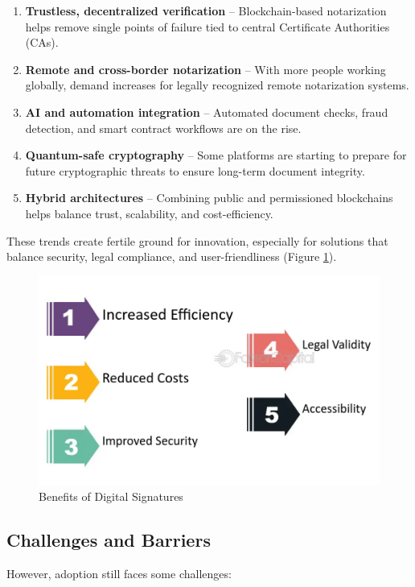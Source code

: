 \begin{enumerate}
    \item \textbf{Trustless, decentralized verification} – Blockchain-based notarization helps remove single points of failure tied to central Certificate Authorities (CAs).
    \item \textbf{Remote and cross-border notarization} – With more people working globally, demand increases for legally recognized remote notarization systems.
    \item \textbf{AI and automation integration} – Automated document checks, fraud detection, and smart contract workflows are on the rise.
    \item \textbf{Quantum-safe cryptography} – Some platforms are starting to prepare for future cryptographic threats to ensure long-term document integrity.
    \item \textbf{Hybrid architectures} – Combining public and permissioned blockchains helps balance trust, scalability, and cost-efficiency.
\end{enumerate}

These trends create fertile ground for innovation, especially for solutions that balance security, legal compliance, and user-friendliness (Figure \ref{benefits-signatures}).

\begin{figure}[H]
    \centering
    \includegraphics[width=18cm]{images/benefits-signatures.png}
    \caption{Benefits of Digital Signatures}
    \label{benefits-signatures}
\end{figure}

\subsection{Challenges and Barriers}
However, adoption still faces some challenges:

